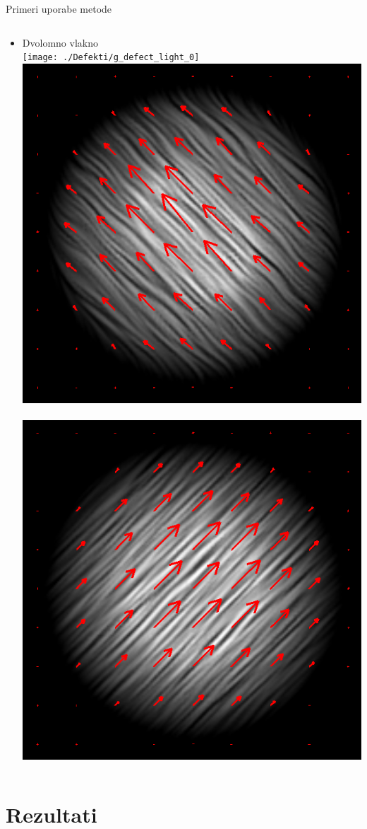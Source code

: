 \documentclass{beamer}
\begin{document}
\begin{frame}{Primeri uporabe metode}
\begin{columns}[c]
\begin{column}[T]{.5\textwidth}
\begin{itemize}[<+->]
 \item Dvolomno vlakno \\
  \hspace{-0.6cm}
  \texttt{[image: ./Defekti/g\_defect\_light\_0]} \,
  \includegraphics[width=.29\textwidth]{./Slike/licp_0_68} \,
  \includegraphics[width=.29\textwidth]{./Slike/licp_0_78}
\end{itemize}

\end{column}

\end{columns}

\end{frame}

\section{Rezultati}
\end{document}
